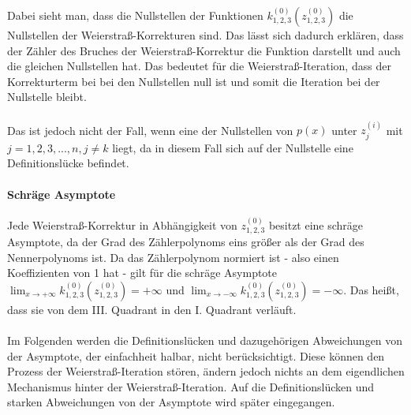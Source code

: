 \documentclass[12pt]{article}
\begin{document}
Dabei sieht man, dass die Nullstellen der Funktionen $k_{1,2,3}^{(0)}(z_{1,2,3}^{(0)})$ die Nullstellen der Weierstraß-Korrekturen sind. Das lässt sich dadurch erklären, dass der Zähler des Bruches der Weierstraß-Korrektur die Funktion darstellt und auch die gleichen Nullstellen hat. Das bedeutet für die Weierstraß-Iteration, dass der Korrekturterm bei bei den Nullstellen null ist und somit die Iteration bei der Nullstelle bleibt.\\\\
Das ist jedoch nicht der Fall, wenn eine der Nullstellen von $p(x)$ unter $z_j^{(i)}$ mit $j=1,2,3,...,n, j \neq k$ liegt, da in diesem Fall sich auf der Nullstelle eine Definitionslücke befindet.

\paragraph{Schräge Asymptote}
Jede Weierstraß-Korrektur in Abhängigkeit von $z_{1,2,3}^{(0)}$ besitzt eine schräge Asymptote, da der Grad des  Zählerpolynoms eins größer als der Grad des Nennerpolynoms ist. Da das Zählerpolynom normiert ist - also einen Koeffizienten von 1 hat - gilt für die schräge Asymptote $\lim_{x\rightarrow +\infty} k_{1,2,3}^{(0)}(z_{1,2,3}^{(0)}) = +\infty$ und $\lim_{x\rightarrow -\infty} k_{1,2,3}^{(0)}(z_{1,2,3}^{(0)}) = -\infty$. Das heißt, dass sie von dem III. Quadrant in den I. Quadrant verläuft.
\\\\
Im Folgenden werden die Definitionslücken und dazugehörigen Abweichungen von der Asymptote, der einfachheit halbar, nicht berücksichtigt. Diese können den Prozess der Weierstraß-Iteration stören, ändern jedoch nichts an dem eigendlichen Mechanismus hinter der Weierstraß-Iteration. Auf die Definitionslücken und starken Abweichungen von der Asymptote wird später eingegangen.
\\\\
\end{document}
